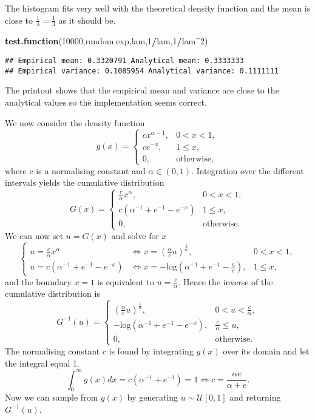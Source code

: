 \documentclass[]{article}
\newenvironment{Shaded}{\begin{snugshade}}{\end{snugshade}}
\newcommand{\DecValTok}[1]{\textcolor[rgb]{0.00,0.00,0.81}{#1}}
\newcommand{\KeywordTok}[1]{\textcolor[rgb]{0.13,0.29,0.53}{\textbf{#1}}}
\newcommand{\NormalTok}[1]{#1}
\newcommand{\OperatorTok}[1]{\textcolor[rgb]{0.81,0.36,0.00}{\textbf{#1}}}
\begin{document}
The histogram fits very well with the theoretical density function and
the mean is close to \(\frac{1}{\lambda}=\frac{1}{3}\) as it should be.

\begin{Shaded}
\begin{Highlighting}[]
\KeywordTok{test.function}\NormalTok{(}\DecValTok{10000}\NormalTok{,random.exp,lam,}\DecValTok{1}\OperatorTok{/}\NormalTok{lam,}\DecValTok{1}\OperatorTok{/}\NormalTok{lam}\OperatorTok{^}\DecValTok{2}\NormalTok{)}
\end{Highlighting}
\end{Shaded}

\begin{verbatim}
## Empirical mean: 0.3320791 Analytical mean: 0.3333333 
## Empirical variance: 0.1085954 Analytical variance: 0.1111111
\end{verbatim}

The printout shows that the empirical mean and variance are close to the
analytical values so the implementation seems correct.

We now consider the density function \[
g(x) = \begin{cases} cx^{\alpha-1}, &0<x<1,\\ ce^{-x}, &1\leq x, \\ 0, &\text{otherwise,} \end{cases}
\] where c is a normalising constant and \(\alpha \in (0,1)\).
Integration over the different intervals yields the cumulative
distribution \[
G(x) = \begin{cases} \frac{c}{\alpha}x^\alpha, &0<x<1,\\ c(\alpha^{-1}+e^{-1}-e^{-x}) &1\leq x, \\ 0, &\text{otherwise}. \end{cases}
\] We can now set \(u=G(x)\) and solve for \(x\) \[
\begin{cases} 
u=\frac{c}{\alpha}x^\alpha &\iff
x = (\frac{\alpha}{c}u)^{\frac{1}{\alpha}} , &0 < x < 1, \\
u = c(\alpha^{-1}+e^{-1}-e^{-x}) &\iff x=-\text{log}(\alpha^{-1}+e^{-1}-\frac{u}{c}), &1\leq x,
\end{cases}
\] and the boundary \(x=1\) is equivalent to \(u=\frac{c}{\alpha}\).
Hence the inverse of the cumulative distribution is \[
G^{-1}(u) = 
\begin{cases}
(\frac{\alpha}{c}u)^{\frac{1}{\alpha}} , &0 < u < \frac{c}{\alpha}, \\
-\text{log}(\alpha^{-1}+e^{-1}-e^{-x}), &\frac{c}{\alpha} \leq u, \\
0, &\text{otherwise}.
\end{cases}
\] The normalising constant \(c\) is found by integrating \(g(x)\) over
its domain and let the integral equal 1. \[
\int_0^\infty g(x)dx = c(\alpha^{-1}+e^{-1})=1 \iff c =\frac{\alpha e}{\alpha+e}.
\] Now we can sample from \(g(x)\) by generating
\(u\sim \mathcal{U}[0,1]\) and returning \(G^{-1}(u)\).
\end{document}

